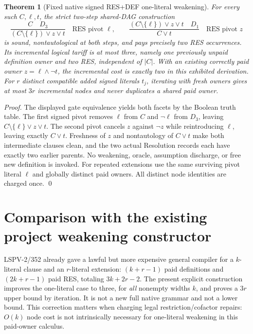 \documentclass[11pt]{article}
\newtheorem{theorem}{Theorem}
\begin{document}
\begin{theorem}[Fixed native signed RES+DEF one-literal weakening]
For every such $C,\ell,t$, the strict two-step shared-DAG construction
\[
 \frac{C\quad D_3}{(C\setminus\{\ell\})\vee z\vee t}
 \quad\text{RES pivot }\ell,
 \qquad
 \frac{(C\setminus\{\ell\})\vee z\vee t\quad D_1}{C\vee t}
 \quad\text{RES pivot }z
\]
is sound, nontautological at both steps, and pays precisely two RES occurrences. Its \emph{incremental} logical tariff is at most three, namely one previously unpaid definition owner and two RES, independent of $|C|$. With an existing correctly paid owner $z=\ell\wedge\neg t$, the incremental cost is exactly two in this exhibited derivation. For $r$ distinct compatible added signed literals $t_j$, iterating with fresh owners gives at most $3r$ incremental nodes and never duplicates a shared paid owner.
\end{theorem}
\begin{proof}
The displayed gate equivalence yields both facets by the Boolean truth table. The first signed pivot removes $\ell$ from $C$ and $\neg\ell$ from $D_3$, leaving $C\setminus\{\ell\}\vee z\vee t$. The second pivot cancels $z$ against $\neg z$ while reintroducing $\ell$, leaving exactly $C\vee t$. Freshness of $z$ and nontautology of $C\vee t$ make both intermediate clauses clean, and the two actual Resolution records each have exactly two earlier parents. No weakening, oracle, assumption discharge, or free new definition is invoked. For repeated extensions use the same surviving pivot literal $\ell$ and globally distinct paid owners. All distinct node identities are charged once. \qed
\end{proof}

\section*{Comparison with the existing project weakening constructor}
LSPV-2/352 already gave a lawful but more expensive general compiler for a $k$-literal clause and an $r$-literal extension: $(k+r-1)$ paid definitions and $(2k+r-1)$ paid RES, totaling $3k+2r-2$. The present explicit construction improves the one-literal case to three, for \emph{all} nonempty widths $k$, and proves a $3r$ upper bound by iteration. It is not a new full native grammar and not a lower bound. This correction matters when charging legal restriction/cofactor repairs: $O(k)$ node cost is not intrinsically necessary for one-literal weakening in this paid-owner calculus.
\end{document}
